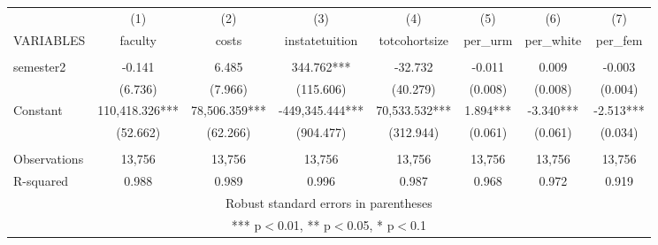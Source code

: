 \documentclass[]{article}
\begin{document}
\begin{tabular}{lccccccc} \hline
 & (1) & (2) & (3) & (4) & (5) & (6) & (7) \\
VARIABLES & faculty & costs & instatetuition & totcohortsize & per\_urm & per\_white & per\_fem \\ \hline
 &  &  &  &  &  &  &  \\
semester2 & -0.141 & 6.485 & 344.762*** & -32.732 & -0.011 & 0.009 & -0.003 \\
 & (6.736) & (7.966) & (115.606) & (40.279) & (0.008) & (0.008) & (0.004) \\
Constant & 110,418.326*** & 78,506.359*** & -449,345.444*** & 70,533.532*** & 1.894*** & -3.340*** & -2.513*** \\
 & (52.662) & (62.266) & (904.477) & (312.944) & (0.061) & (0.061) & (0.034) \\
 &  &  &  &  &  &  &  \\
Observations & 13,756 & 13,756 & 13,756 & 13,756 & 13,756 & 13,756 & 13,756 \\
 R-squared & 0.988 & 0.989 & 0.996 & 0.987 & 0.968 & 0.972 & 0.919 \\ \hline
\multicolumn{8}{c}{ Robust standard errors in parentheses} \\
\multicolumn{8}{c}{ *** p$<$0.01, ** p$<$0.05, * p$<$0.1} \\
\end{tabular}
\end{document}
